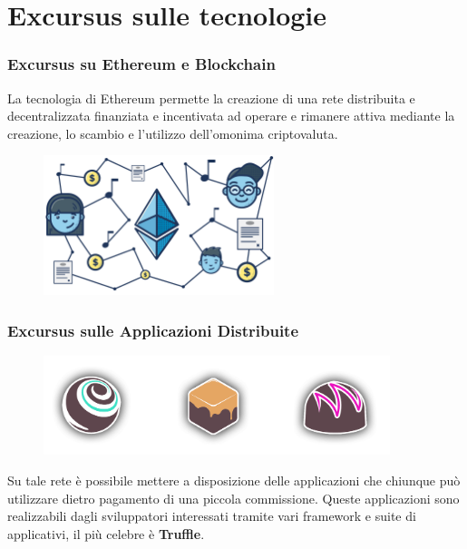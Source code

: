 \documentclass{beamer}
\begin{document}
\section{Excursus sulle tecnologie}
\begin{frame}
	\frametitle{Excursus su Ethereum e Blockchain}
	La tecnologia di Ethereum permette la creazione di una rete distribuita e decentralizzata finanziata e incentivata ad operare e rimanere attiva mediante la creazione, lo scambio e l’utilizzo dell’omonima criptovaluta.
	\medskip
	\begin{figure}
		\includegraphics[width=0.60\textwidth]{figures/blockchain.png}
	\end{figure}
\end{frame}
\begin{frame}
	\frametitle{Excursus sulle Applicazioni Distribuite}
	\begin{figure}
		\includegraphics[width=0.90\textwidth]{figures/truffle.png}
	\end{figure}
	\bigskip
	Su tale rete è possibile mettere a disposizione delle applicazioni che chiunque può utilizzare dietro pagamento di una piccola commissione. Queste applicazioni sono realizzabili dagli sviluppatori interessati tramite vari framework e suite di applicativi, il più celebre è \textbf{Truffle}.
\end{frame}
\end{document}
